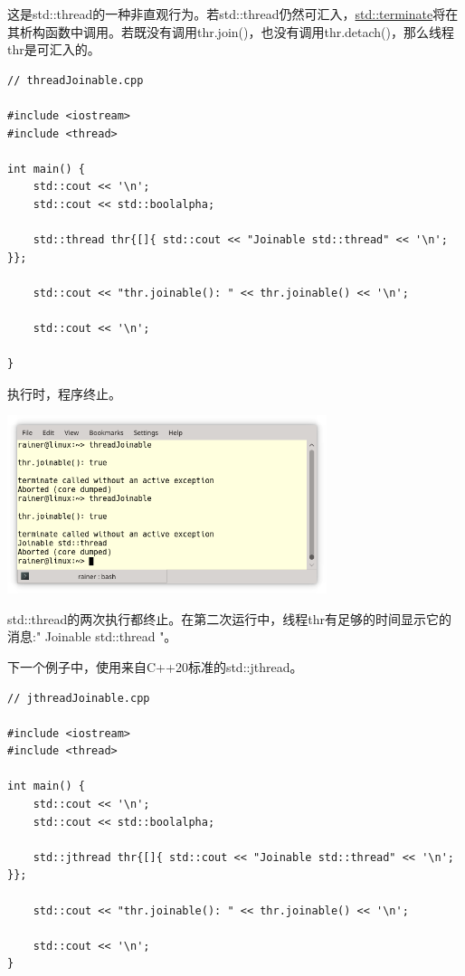 
这是std::thread的一种非直观行为。若std::thread仍然可汇入，\href{https://en.cppreference.com/w/cpp/error/terminate}{std::terminate}将在其析构函数中调用。若既没有调用thr.join()，也没有调用thr.detach()，那么线程thr是可汇入的。

\begin{lstlisting}[style=styleCXX]
// threadJoinable.cpp

#include <iostream>
#include <thread>

int main() {
	std::cout << '\n';
	std::cout << std::boolalpha;
	
	std::thread thr{[]{ std::cout << "Joinable std::thread" << '\n'; }};
	
	std::cout << "thr.joinable(): " << thr.joinable() << '\n';
	
	std::cout << '\n';
	
}
\end{lstlisting}

执行时，程序终止。

\begin{center}
\includegraphics[width=0.7\textwidth]{content/3/chapter6/images/25.png}\\
\end{center}

std::thread的两次执行都终止。在第二次运行中，线程thr有足够的时间显示它的消息:" Joinable std::thread "。

下一个例子中，使用来自C++20标准的std::jthread。

\begin{lstlisting}[style=styleCXX]
// jthreadJoinable.cpp

#include <iostream>
#include <thread>

int main() {
	std::cout << '\n';
	std::cout << std::boolalpha;
	
	std::jthread thr{[]{ std::cout << "Joinable std::thread" << '\n'; }};
	
	std::cout << "thr.joinable(): " << thr.joinable() << '\n';
	
	std::cout << '\n';
}
\end{lstlisting}

